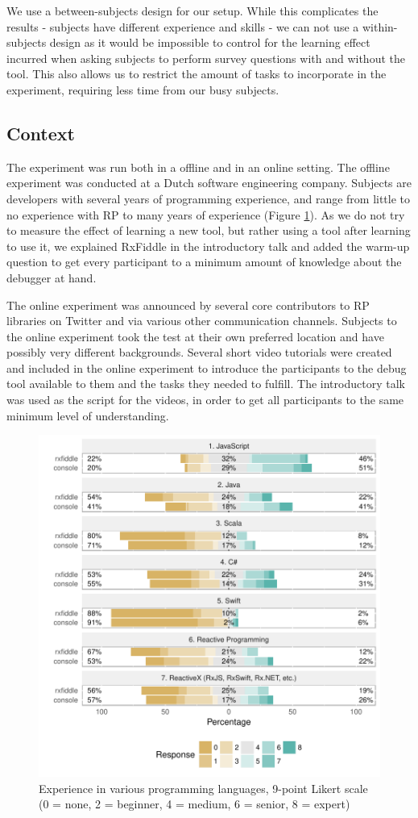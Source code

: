 We use a between-subjects design for our setup. While this complicates the results - subjects have different experience and skills - we can not use a within-subjects design as it would be impossible to control for the learning effect incurred when asking subjects to perform survey questions with and without the tool. This also allows us to restrict the amount of tasks to incorporate in the experiment, requiring less time from our busy subjects.


\subsection{Context}
The experiment was run both in a offline and in an online setting.
The offline experiment was conducted at a Dutch software engineering company. Subjects are developers with several years of programming experience, and range from little to no experience with RP to many years of experience (Figure \ref{fig-experience}).
As we do not try to measure the effect of learning a new tool, but rather using a tool after learning to use it, we explained RxFiddle in the introductory talk and added the warm-up question to get every participant to a minimum amount of knowledge about the debugger at hand.

The online experiment was announced by several core contributors to RP libraries on Twitter and via various other communication channels. Subjects to the online experiment took the test at their own preferred location and have possibly very different backgrounds. Several short video tutorials were created and included in the online experiment to introduce the participants to the debug tool available to them and the tasks they needed to fulfill. The introductory talk was used as the script for the videos, in order to get all participants to the same minimum level of understanding.

\begin{figure}[t]
\includegraphics[width=\columnwidth]{images/experience.pdf}
\caption{Experience in various programming languages, 9-point Likert scale (0 = none, 2 = beginner, 4 = medium, 6 = senior, 8 = expert)}
\label{fig-experience}
\end{figure}
